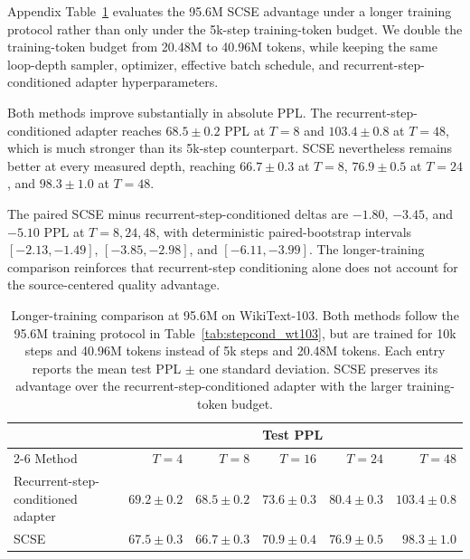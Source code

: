 \documentclass[letterpaper]{article} %
\newcommand{\SCSE}{\textsc{SCSE}}
\theoremstyle{remark}
\begin{document}
Appendix Table~\ref{tab:long10k_95m} evaluates the 95.6M \SCSE{} advantage under a longer training protocol rather than only under the 5k-step training-token budget.  We double the training-token budget from 20.48M to 40.96M tokens, while keeping the same loop-depth sampler, optimizer, effective batch schedule, and recurrent-step-conditioned adapter hyperparameters.

Both methods improve substantially in absolute PPL.  The recurrent-step-conditioned adapter reaches $68.5\pm0.2$ PPL at $T=8$ and $103.4\pm0.8$ at $T=48$, which is much stronger than its 5k-step counterpart.  \SCSE{} nevertheless remains better at every measured depth, reaching $66.7\pm0.3$ at $T=8$, $76.9\pm0.5$ at $T=24$, and $98.3\pm1.0$ at $T=48$.

The paired \SCSE{} minus recurrent-step-conditioned deltas are $-1.80$, $-3.45$, and $-5.10$ PPL at $T=8,24,48$, with deterministic paired-bootstrap intervals $[-2.13,-1.49]$, $[-3.85,-2.98]$, and $[-6.11,-3.99]$.  The longer-training comparison reinforces that recurrent-step conditioning alone does not account for the source-centered quality advantage.

\begin{table}[t!]
	\centering
	\scriptsize
	\begin{tabular}{lrrrrr}
		\toprule
		                                   & \multicolumn{5}{c}{Test PPL}                                                                                                 \\
		\cmidrule(lr){2-6}
		Method                             & $T=4$                        & $T=8$                 & $T=16$                & $T=24$                & $T=48$                \\
		\midrule
		Recurrent-step-conditioned adapter & $69.2\pm0.2$                 & $68.5\pm0.2$          & $73.6\pm0.3$          & $80.4\pm0.3$          & $103.4\pm0.8$         \\
		\SCSE{}                            & $\mathbf{67.5\pm0.3}$        & $\mathbf{66.7\pm0.3}$ & $\mathbf{70.9\pm0.4}$ & $\mathbf{76.9\pm0.5}$ & $\mathbf{98.3\pm1.0}$ \\
		\bottomrule
	\end{tabular}
	\caption{Longer-training comparison at 95.6M on WikiText-103.  Both methods follow the 95.6M training protocol in Table~\ref{tab:stepcond_wt103}, but are trained for 10k steps and 40.96M tokens instead of 5k steps and 20.48M tokens.  Each entry reports the mean test PPL $\pm$ one standard deviation.  \SCSE{} preserves its advantage over the recurrent-step-conditioned adapter with the larger training-token budget.}
	\label{tab:long10k_95m}
\end{table}
\end{document}
